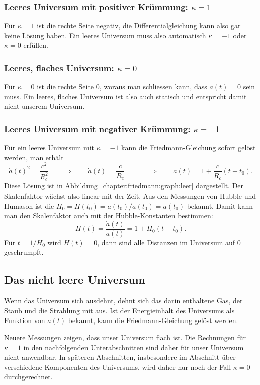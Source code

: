 \subsubsection{Leeres Universum mit positiver Krümmung: $\kappa=1$}
Für $\kappa=1$ ist die rechte Seite negativ, die Differentialgleichung
kann also gar keine Lösung haben.
Ein leeres Universum muss also automatisch $\kappa=-1$ oder $\kappa=0$
erfüllen.

\subsubsection{Leeres, flaches Universum: $\kappa=0$}
Für $\kappa=0$ ist die rechte Seite $0$, woraus man schliessen kann,
dass $\dot a(t)=0$ sein muss.
Ein leeres, flaches Universum ist also auch statisch und entspricht
damit nicht unserem Universum.

\subsubsection{Leeres Universum mit negativer Krümmung: $\kappa=-1$}
Für ein leeres Universum mit $\kappa=-1$ kann die Friedmann-Gleichung sofort
gelöst werden, man erhält
\[
\dot a(t)^2
=
\frac{c^2}{R_c^2}
\qquad\Rightarrow\qquad
\dot a(t) = \frac{c}{R_c} = 
\qquad\Rightarrow\qquad
a(t)= 1 + \frac{c}{R_c}(t-t_0).
\]
Diese Lösung ist in Abbildung~\ref{chapter:friedmann:graph:leer} dargestellt.
Der Skalenfaktor wächst also linear mit der Zeit.
Aus den Messungen von Hubble und Humason ist die
$H_0=H(t_0)=\dot a(t_0)/a(t_0)=\dot a(t_0)$
bekannt.
Damit kann man den Skalenfaktor auch mit der Hubble-Konstanten
bestimmen:
\[
H(t) =  \frac{\dot a(t)}{a(t)} = 1 + H_0(t-t_0).
\]
Für $t=1/H_0$ wird $H(t)=0$, dann sind alle Distanzen im
Universum auf $0$ geschrumpft.


\subsection{Das nicht leere Universum}
Wenn das Universum sich ausdehnt, dehnt sich das darin enthaltene
Gas, der Staub und die Strahlung mit aus.
Ist der Energieinhalt des Universums als Funktion von $a(t)$ bekannt,
kann die Friedmann-Gleichung gelöst werden.

Neuere Messungen zeigen, dass unser Universum flach ist.
Die Rechnungen für $\kappa=1$ in den nachfolgenden Unterabschnitten
sind daher für unser Universum nicht anwendbar.
In späteren Abschnitten, insbesondere im Abschnitt über verschiedene
Komponenten des Universums, wird daher nur noch der Fall $\kappa=0$
durchgerechnet.

